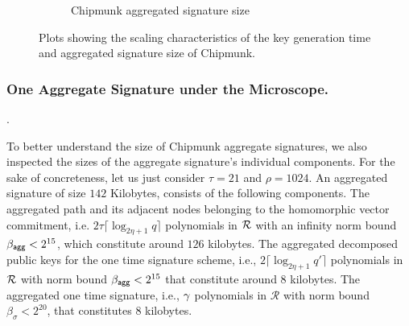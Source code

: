 \begin{figure}[H]
\begin{subfigure}[b]{0.49\textwidth}
  \caption{Chipmunk aggregated signature size}
  \label{fig:sigize}
  \end{subfigure}
  \caption{Plots showing the scaling characteristics of the key generation time and aggregated signature size of Chipmunk.} \label{fig:keygen}
\end{figure}

\subsubsection{One Aggregate Signature under the Microscope.}

\mbox{}.

To better understand the size of Chipmunk aggregate signatures, we also inspected the sizes of the aggregate signature's individual components.
For the sake of concreteness, let us just consider $\tau=21$ and $\rho=1024$.
An aggregated signature of size $142$ Kilobytes, consists of the following components.
The aggregated path and its adjacent nodes belonging to the homomorphic vector commitment, i.e. $2\tau\lceil\log_{2\eta+1}q\rceil$ polynomials in $\mathcal{R}$ with an infinity norm bound $\beta_{\mathsf{agg}} <2^{15}$, which constitute around $126$ kilobytes.
The aggregated decomposed public keys for the one time signature scheme, i.e., $2\lceil\log_{2\eta+1}q'\rceil$ polynomials in $\mathcal{R}$ with norm bound $\beta_{\mathsf{agg}} < 2^{15}$ that constitute around $8$ kilobytes.
The aggregated one time signature, i.e., $\gamma$ polynomials  in $\mathcal{R}$ with norm bound $\beta_\sigma < 2^{20}$, that constitutes $8$ kilobytes. 
